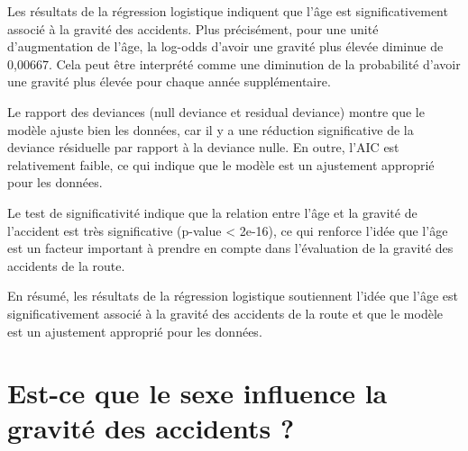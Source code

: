 \documentclass[
]{article}
\begin{document}
Les résultats de la régression logistique indiquent que l'âge est
significativement associé à la gravité des accidents. Plus précisément,
pour une unité d'augmentation de l'âge, la log-odds d'avoir une gravité
plus élevée diminue de 0,00667. Cela peut être interprété comme une
diminution de la probabilité d'avoir une gravité plus élevée pour chaque
année supplémentaire.

Le rapport des deviances (null deviance et residual deviance) montre que
le modèle ajuste bien les données, car il y a une réduction
significative de la deviance résiduelle par rapport à la deviance nulle.
En outre, l'AIC est relativement faible, ce qui indique que le modèle
est un ajustement approprié pour les données.

Le test de significativité indique que la relation entre l'âge et la
gravité de l'accident est très significative (p-value \textless{}
2e-16), ce qui renforce l'idée que l'âge est un facteur important à
prendre en compte dans l'évaluation de la gravité des accidents de la
route.

En résumé, les résultats de la régression logistique soutiennent l'idée
que l'âge est significativement associé à la gravité des accidents de la
route et que le modèle est un ajustement approprié pour les données.

\hypertarget{est-ce-que-le-sexe-influence-la-gravituxe9-des-accidents}{%
\section{Est-ce que le sexe influence la gravité des accidents
?}\label{est-ce-que-le-sexe-influence-la-gravituxe9-des-accidents}}
\end{document}
